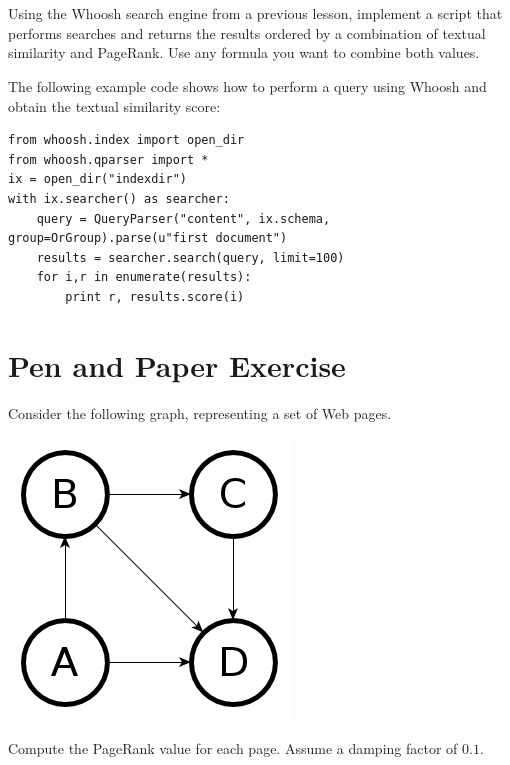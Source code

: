 \documentclass[12pt]{article}
\begin{document}
\section{}

Using the Whoosh search engine from a previous lesson, implement a script that performs
searches and returns the results ordered by a combination of textual similarity
and PageRank. Use any formula you want to combine both values.

The following example code shows how to perform a query using Whoosh and obtain
the textual similarity score:
\begin{verbatim}
from whoosh.index import open_dir
from whoosh.qparser import *
ix = open_dir("indexdir")
with ix.searcher() as searcher:
    query = QueryParser("content", ix.schema, group=OrGroup).parse(u"first document")
    results = searcher.search(query, limit=100)
    for i,r in enumerate(results):
        print r, results.score(i)
\end{verbatim}

\section{Pen and Paper Exercise}

Consider the following graph, representing a set of Web pages.
\begin{center}
    \includegraphics[scale=.5]{graph01}
\end{center}
Compute the PageRank value for each page. Assume a damping factor of $0.1$.
\end{document}
